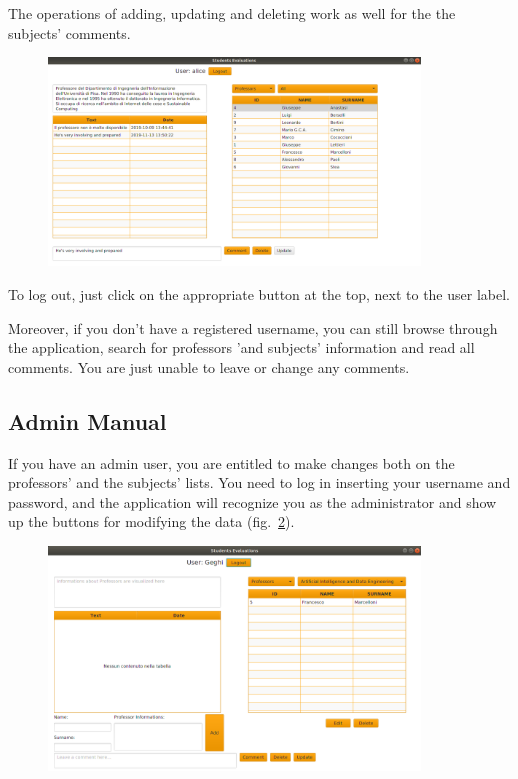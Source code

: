 \documentclass[a4paper]{article}
\begin{document}
The operations of adding, updating and deleting work as well for the the subjects' comments.
\begin{figure}[h]
\centering
\includegraphics[width=0.88\textwidth]{images/screens/screen5}
\label{fig:screen5}
\end{figure}

To log out, just click on the appropriate button at the top, next to the user label.

Moreover, if you don't have a registered username, you can still browse through the application, search for professors 'and subjects' information and read all comments. You are just unable to leave or change any comments.

\clearpage
\subsection{Admin Manual}
If you have an admin user, you are entitled to make changes both on the professors' and the subjects' lists. You need to log in inserting your username and password, and the application will recognize you as the administrator and show up the buttons for modifying the data (fig.~\ref{fig:adminLogin}).

\begin{figure}[h]
\centering
\includegraphics[width=0.88\textwidth]{images/screens/adminLogin}
\label{fig:adminLogin}
\end{figure}
\end{document}
